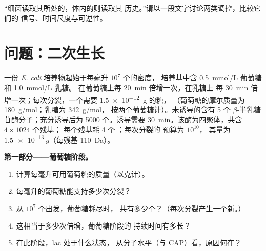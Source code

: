 \begin{exercise}[$\star\star\star$]\label{exo:b1:expression-control:12}
“细菌读取其所处的，体内的则读取其
历史。”请以一段文字讨论两类调控，比较它们的
信号、时间尺度与可逆性。
\end{exercise}

\section{问题：二次生长}

\begin{problem}
\label{pb:b1:expression-control:1}
一份 \emph{E. coli} 培养物起始于每毫升 $10^7$ 个的密度，
培养基中含 \qty{0.5}{mmol/L} 葡萄糖和 \qty{1.0}{mmol/L} 乳糖。
在葡萄糖上每 \qty{20}{min} 倍增一次，在乳糖上
每 \qty{30}{min} 倍增一次；每次分裂，一个需要 \qty{1.5e-12}{g} 的糖，
（葡萄糖的摩尔质量为 \qty{180}{g/mol}；乳糖为 \qty{342}{g/mol}，
按两个葡萄糖计）。未诱导的含有 5 个
$\beta$-半乳糖苷酶分子；充分诱导后为 \num{5000} 个。诱导需要
\qty{30}{min}。该酶为四聚体，共含 $4\times 1024$ 个残基；
每个残基耗 4 个 ；每次分裂的  预算为 $10^{10}$，
其量为 $\qty{1.5e-13}{g}$（每残基 \qty{110}{Da}）。

\medskip
\noindent\textbf{第一部分——葡萄糖阶段。}
\begin{enumerate}
  \item 计算每毫升可用葡萄糖的质量（以克计）。
  \item 每毫升的葡萄糖能支持多少次分裂？
  \item 从 $10^7$ 个出发，葡萄糖耗尽时，
        共有多少个？（每次分裂产生一个新。）
  \item 这相当于多少次倍增，葡萄糖阶段的
        持续时间有多长？
  \item 在此阶段，lac 处于什么状态，
        从分子水平（与 CAP）看，原因何在？
\end{enumerate}


\end{problem}

